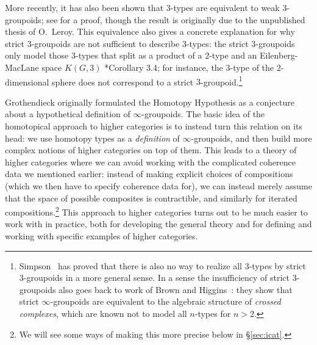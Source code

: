 \documentclass[a4paper,11pt]{article}
\begin{document}
\begin{remark}
  More recently, it has also been shown that $3$-types are equivalent to
  weak $3$-groupoids; see \cite{Berger3Type} for a proof, though the
  result is originally due to the unpublished thesis of O.~Leroy. This
  equivalence also gives a concrete explanation for why strict
  $3$-groupoids are not sufficient to describe $3$-types: the strict
  $3$-groupoids only model those $3$-types that split as a product of a
  $2$-type and an Eilenberg-MacLane space $K(G,3)$
  \cite{Berger3Type}*{Corollary 3.4}; for instance, the $3$-type of the
  $2$-dimensional sphere does not correspond to a strict
  $3$-groupoid.\footnote{Simpson~\cite{Simpson3Type} has proved that
    there is also no way to realize all $3$-types by strict $3$-groupoids
    in a more general sense. In a sense the insufficiency of strict
    $3$-groupoids also goes back to work of Brown and
    Higgins~\cite{BrownHiggins}: they show that strict
    $\infty$-groupoids are equivalent to the algebraic structure of
    \emph{crossed complexes}, which are known not to model all $n$-types for $n > 2$.}
\end{remark}

Grothendieck originally formulated the Homotopy Hypothesis as a
conjecture about a hypothetical definition of $\infty$-groupoids. The
basic idea of the homotopical approach to higher categories is to
instead turn this relation on its head: we use homotopy types as a
\emph{definition} of $\infty$-groupoids, and then build more complex
notions of higher categories on top of them. This leads to a theory of
higher categories where we can avoid working with the complicated
coherence data we mentioned earlier: instead of making explicit
choices of compositions (which we then have to specify coherence data
for), we can instead merely assume that the space of possible
composites is contractible, and similarly for iterated
compositions.\footnote{We will see some ways of making this more
  precise below in \S\ref{sec:icat}.} This approach to higher
categories turns out to be much easier to work with in practice, both
for developing the general theory and for defining and working with
specific examples of higher categories.
\end{document}
